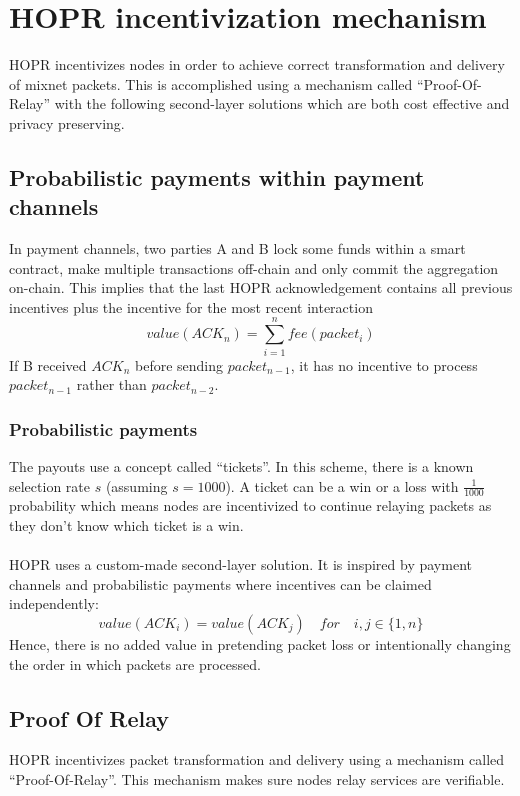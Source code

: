 \section{HOPR incentivization mechanism}
HOPR incentivizes nodes in order to achieve correct transformation and delivery of mixnet packets. 
This is accomplished using a mechanism called “Proof-Of-Relay” with the following second-layer solutions which are both cost effective and privacy preserving.

\subsection{Probabilistic payments within payment channels}
In payment channels, two parties A and B lock some funds within a smart contract, make multiple transactions off-chain and only commit the aggregation on-chain. 
This implies that the last HOPR acknowledgement contains all previous incentives plus the incentive for the most recent interaction 
   $$value(ACK_n) =\sum_{i=1}^nfee(packet_i)$$
If B received $ACK_n$ before sending $packet_{n-1}$, it has no incentive to process $packet_{n-1}$ rather than $packet_{n-2}$. 

\subsubsection{Probabilistic payments}  
The payouts use a concept called “tickets”. In this scheme, there is a known selection rate $s$ (assuming $s=1000$).
A ticket can be a win or a loss with $\frac{1}{1000}$ probability which means nodes are incentivized to continue relaying packets as they don’t know which ticket is a win. 
\\~\\HOPR uses a custom-made second-layer solution. It is inspired by payment channels and probabilistic payments where incentives can be claimed independently: 
$$value ( ACK_i )=value ( ACK_j ) \quad for \quad i,j\in \{1,n\}$$
Hence, there is no added value in pretending packet loss or intentionally changing the order in which packets are processed. 

\subsection{Proof Of Relay}

HOPR incentivizes packet transformation and delivery using a mechanism called “Proof-Of-Relay”. 
This mechanism makes sure nodes relay services are verifiable.
